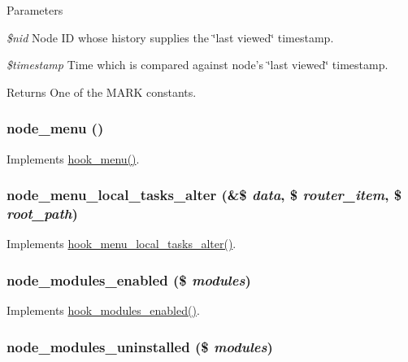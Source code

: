 \begin{DoxyParams}{Parameters}
\item[{\em \$nid}]Node ID whose history supplies the \char`\"{}last viewed\char`\"{} timestamp. \item[{\em \$timestamp}]Time which is compared against node's \char`\"{}last viewed\char`\"{} timestamp.\end{DoxyParams}
\begin{DoxyReturn}{Returns}
One of the MARK constants. 
\end{DoxyReturn}
\hypertarget{node_8module_a15e8d85a7559f22b8f2c77c1d5dfac63}{
\subsubsection[{node\_\-menu}]{\setlength{\rightskip}{0pt plus 5cm}node\_\-menu ()}}
\label{node_8module_a15e8d85a7559f22b8f2c77c1d5dfac63}
Implements \hyperlink{group__hooks_ga5c95244fea59b25666e409759e133ded}{hook\_\-menu()}. \hypertarget{node_8module_a3aea86c33ef8c4f752d5db0f8d445426}{
\subsubsection[{node\_\-menu\_\-local\_\-tasks\_\-alter}]{\setlength{\rightskip}{0pt plus 5cm}node\_\-menu\_\-local\_\-tasks\_\-alter (\&\$ {\em data}, \/  \$ {\em router\_\-item}, \/  \$ {\em root\_\-path})}}
\label{node_8module_a3aea86c33ef8c4f752d5db0f8d445426}
Implements \hyperlink{group__hooks_gac828fb6b28f1a8bb01c444a9b2331f5f}{hook\_\-menu\_\-local\_\-tasks\_\-alter()}. \hypertarget{node_8module_a63f6e95d242dbc0d8acf8f31413c0ab3}{
\subsubsection[{node\_\-modules\_\-enabled}]{\setlength{\rightskip}{0pt plus 5cm}node\_\-modules\_\-enabled (\$ {\em modules})}}
\label{node_8module_a63f6e95d242dbc0d8acf8f31413c0ab3}
Implements \hyperlink{group__hooks_ga0eb7c67333e0f40b4a46c0dc4c4a92f3}{hook\_\-modules\_\-enabled()}. \hypertarget{node_8module_a66de7f3493edd4a5e015a48a31992e0a}{
\subsubsection[{node\_\-modules\_\-uninstalled}]{\setlength{\rightskip}{0pt plus 5cm}node\_\-modules\_\-uninstalled (\$ {\em modules})}}
